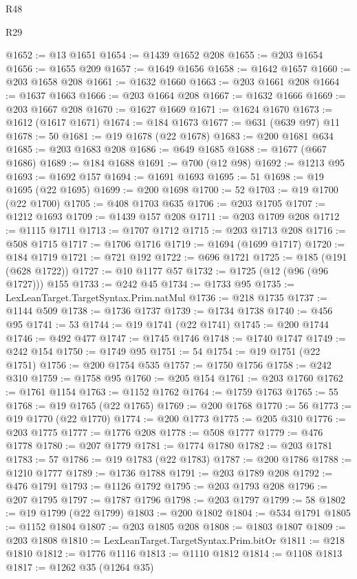 \begin{lexlean}{R48}
\begin{lexlean}{R29}
\begin{coremodule}
{{{{{{{{{{{{{{{{{{{{{{{{{{{{{{{{{{{{{{{{{{{{{{{{{{{{{{{{{{{{{{{{{{{{{{{{{{{{{{{{{{{{{{{{{{{{{{{{{{{{{{{{{{{{{{{{{{{{{{{{{{{{{{{{{{{{{{{{{{{{{{{{{{{{{{{{{{{{{{{{{{{{{{{{{{{{{{{{{{{{{{{{{{{{{{{{{{{{{{{{{{{{{{{{{{{{{{{{{{@1652 := @13 @1651
@1654 := @1439 @1652 @208
@1655 := @203 @1654
@1656 := @1655 @209
@1657 := @1649 @1656
@1658 := @1642 @1657
@1660 := @203 @1658 @208
@1661 := @1632 @1660
@1663 := @203 @1661 @208
@1664 := @1637 @1663
@1666 := @203 @1664 @208
@1667 := @1632 @1666
@1669 := @203 @1667 @208
@1670 := @1627 @1669
@1671 := @1624 @1670
@1673 := @1612 (@1617 @1671)
@1674 := @184 @1673
@1677 := @631 (@639 @97) @11
@1678 := 50
@1681 := @19 @1678 (@22 @1678)
@1683 := @200 @1681 @634
@1685 := @203 @1683 @208
@1686 := @649 @1685
@1688 := @1677 (@667 @1686)
@1689 := @184 @1688
@1691 := @700 (@12 @98)
@1692 := @1213 @95
@1693 := @1692 @157
@1694 := @1691 @1693
@1695 := 51
@1698 := @19 @1695 (@22 @1695)
@1699 := @200 @1698
@1700 := 52
@1703 := @19 @1700 (@22 @1700)
@1705 := @408 @1703 @635
@1706 := @203 @1705
@1707 := @1212 @1693
@1709 := @1439 @157 @208
@1711 := @203 @1709 @208
@1712 := @1115 @1711
@1713 := @1707 @1712
@1715 := @203 @1713 @208
@1716 := @508 @1715
@1717 := @1706 @1716
@1719 := @1694 (@1699 @1717)
@1720 := @184 @1719
@1721 := @721 @192
@1722 := @696 @1721
@1725 := @185 (@191 (@628 @1722))
@1727 := @10 @1177 @57
@1732 := @1725 (@12 (@96 (@96 @1727))) @155
@1733 := @242 @45
@1734 := @1733 @95
@1735 := LexLeanTarget.TargetSyntax.Prim.natMul
@1736 := @218 @1735
@1737 := @1144 @509
@1738 := @1736 @1737
@1739 := @1734 @1738
@1740 := @456 @95
@1741 := 53
@1744 := @19 @1741 (@22 @1741)
@1745 := @200 @1744
@1746 := @492 @477
@1747 := @1745 @1746
@1748 := @1740 @1747
@1749 := @242 @154
@1750 := @1749 @95
@1751 := 54
@1754 := @19 @1751 (@22 @1751)
@1756 := @200 @1754 @535
@1757 := @1750 @1756
@1758 := @242 @310
@1759 := @1758 @95
@1760 := @205 @154
@1761 := @203 @1760
@1762 := @1761 @1154
@1763 := @1152 @1762
@1764 := @1759 @1763
@1765 := 55
@1768 := @19 @1765 (@22 @1765)
@1769 := @200 @1768
@1770 := 56
@1773 := @19 @1770 (@22 @1770)
@1774 := @200 @1773
@1775 := @205 @310
@1776 := @203 @1775
@1777 := @1776 @208
@1778 := @508 @1777
@1779 := @476 @1778
@1780 := @207 @1779
@1781 := @1774 @1780
@1782 := @203 @1781
@1783 := 57
@1786 := @19 @1783 (@22 @1783)
@1787 := @200 @1786
@1788 := @1210 @1777
@1789 := @1736 @1788
@1791 := @203 @1789 @208
@1792 := @476 @1791
@1793 := @1126 @1792
@1795 := @203 @1793 @208
@1796 := @207 @1795
@1797 := @1787 @1796
@1798 := @203 @1797
@1799 := 58
@1802 := @19 @1799 (@22 @1799)
@1803 := @200 @1802
@1804 := @534 @1791
@1805 := @1152 @1804
@1807 := @203 @1805 @208
@1808 := @1803 @1807
@1809 := @203 @1808
@1810 := LexLeanTarget.TargetSyntax.Prim.bitOr
@1811 := @218 @1810
@1812 := @1776 @1116
@1813 := @1110 @1812
@1814 := @1108 @1813
@1817 := @1262 @35 (@1264 @35)
}}}}}}}}}}}}}}}}}}}}}}}}}}}}}}}}}}}}}}}}}}}}}}}}}}}}}}}}}}}}}}}}}}}}}}}}}}}}}}}}}}}}}}}}}}}}}}}}}}}}}}}}}}}}}}}}}}}}}}}}}}}}}}}}}}}}}}}}}}}}}}}}}}}}}}}}}}}}}}}}}}}}}}}}}}}}}}}}}}}}}}}}}}}}}}}}}}}}}}}}}}}}}}}}}}}}}}}}}}
\end{coremodule}
\end{lexlean}
\end{lexlean}
